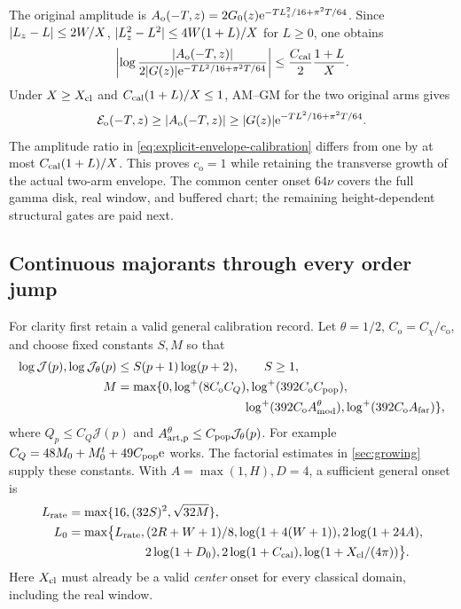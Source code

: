 The original amplitude is
\(A_{\mathrm o}(-T,z)=2G_0(z)\mathrm e^{-TL_z^2/16+\pi^2T/64}\).
Since \(\lvert L_z-L\rvert\le2W/X\),
\(\lvert L_z^2-L^2\rvert\le4W(1+L)/X\) for \(L\ge0\), one obtains
\begin{equation}
 \left|\log\frac{\lvert A_{\mathrm o}(-T,z)\rvert}
 {2\lvert G(z)\rvert\mathrm e^{-TL^2/16+\pi^2T/64}}\right|
 \le\frac{C_{\rm cal}}2\frac{1+L}{X}.
 \label{eq:explicit-envelope-calibration}
\end{equation}
Under \(X\ge X_{\rm cl}\) and
\(C_{\rm cal}(1+L)/X\le1\), AM--GM for the two original arms gives
\begin{equation}
 \mathcal E_{\mathrm o}(-T,z)\ge\lvert A_{\mathrm o}(-T,z)\rvert
 \ge\lvert G(z)\rvert\mathrm e^{-TL^2/16+\pi^2T/64}.
 \label{eq:explicit-envelope-lower}
\end{equation}
The amplitude ratio in \eqref{eq:explicit-envelope-calibration}
differs from one by at most \(C_{\rm cal}(1+L)/X\).
This proves \(c_{\mathrm o}=1\) while retaining the transverse growth
of the actual two-arm envelope. The common center onset \(64\nu\)
covers the full gamma disk, real window, and buffered chart;
the remaining height-dependent structural gates are paid next.

\subsection{Continuous majorants through every order jump}
\label{subsec:explicit-onset}
For clarity first retain a valid general calibration record.
Let \(\theta=1/2\), \(C_{\mathrm o}=C_\chi/c_{\mathrm o}\),
and choose fixed constants \(S,M\) so that
\begin{align}
 \log\mathcal J(p),\log\mathcal J_\theta(p)
   &\le S(p+1)\log(p+2),\qquad S\ge1,\nonumber\\
 M&=\max\{0,\log^+(8C_{\mathrm o}C_Q),
       \log^+(392C_{\mathrm o}C_{\rm pop}),\nonumber\\
 &\hspace{36mm}\log^+(392C_{\mathrm o}A_{\rm mod}^\theta),
       \log^+(392C_{\mathrm o}A_{\rm far})\},
 \label{eq:onset-log-costs}
\end{align}
where \(Q_p\le C_Q\mathcal J(p)\) and
\(A_{\rm art,p}^\theta\le C_{\rm pop}\mathcal J_\theta(p)\).
For example \(C_Q=48M_0+M_0^t+49C_{\rm pop}\mathrm e\) works.
The factorial estimates in \cref{sec:growing} supply these constants.
With \(A=\max(1,H),D=4\), a sufficient general onset is
\begin{align}
 L_{\rm rate}&=\max\{16,(32S)^2,\sqrt{32M}\},\nonumber\\
 L_0&=\max\bigl\{L_{\rm rate},(2R+W+1)/8,\log(1+4(W+1)),
       2\log(1+24A),\nonumber\\
 &\hspace{22mm}2\log(1+D_0),2\log(1+C_{\rm cal}),
                  \log(1+X_{\rm cl}/(4\pi))\bigr\}.
 \label{eq:parameterized-onset}
\end{align}
Here \(X_{\rm cl}\) must already be a valid \emph{center} onset
for every classical domain, including the real window.

